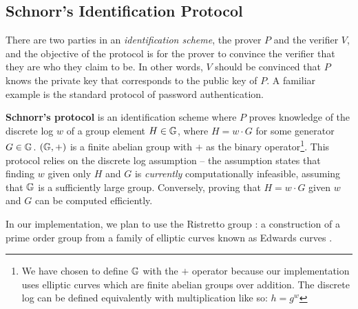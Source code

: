 \subsection{Schnorr's Identification Protocol}\label{sec:schnorr}
There are two parties in an \textit{identification scheme}, the prover $P$ and the verifier $V$, and the objective of the protocol is for the prover to convince the verifier that they are who they claim to be. In other words, $V$ should be convinced that $P$ knows the private key that corresponds to the public key of $P$. A familiar example is the standard protocol of password authentication.

\textbf{Schnorr's protocol} \cite{Schnorr} is an identification scheme where $P$ proves knowledge of the discrete log $w$ of a group element $H \in \mathbb{G}$, where $H = w \cdot G$ for some generator $G \in \mathbb{G}$. $(\mathbb{G}, +)$ is a finite abelian group with $+$ as the binary operator\footnote{We have chosen to define $\mathbb{G}$ with the $+$ operator because our implementation uses elliptic curves which are finite abelian groups over addition. The discrete log can be defined equivalently with multiplication like so: $h = g^w$}. 
This protocol relies on the discrete log assumption \cite{Diffie1976NewDI} -- the assumption states that finding $w$ given only $H$ and $G$ is \textit{currently} computationally infeasible, assuming that $\mathbb{G}$ is a sufficiently large group. Conversely, proving that $H = w \cdot G$ given $w$ and $G$ can be computed efficiently. 

In our implementation, we plan to use the Ristretto group \cite{ristretto_web}: a construction of a prime order group from a family of elliptic curves known as Edwards curves \cite{Edwards2007}. 

